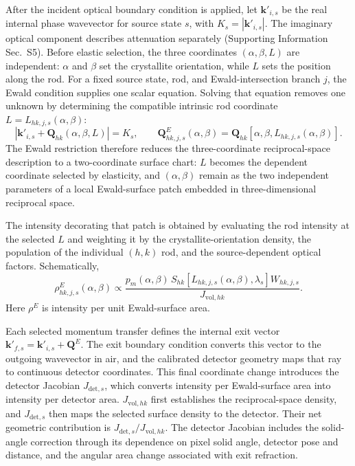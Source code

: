 After the incident optical boundary condition is applied, let $\mathbf k'_{i,s}$ be the real internal phase wavevector for source state $s$, with $K_s=|\mathbf k'_{i,s}|$. The imaginary optical component describes attenuation separately (Supporting Information Sec.~S5). Before elastic selection, the three coordinates $(\alpha,\beta,L)$ are independent: $\alpha$ and $\beta$ set the crystallite orientation, while $L$ sets the position along the rod. For a fixed source state, rod, and Ewald-intersection branch $j$, the Ewald condition supplies one scalar equation. Solving that equation removes one unknown by determining the compatible intrinsic rod coordinate $L=L_{hk,j,s}(\alpha,\beta)$:
\begin{equation}
  \left|\mathbf k'_{i,s}+\mathbf Q_{hk}(\alpha,\beta,L)\right|=K_s,
  \qquad
  \mathbf Q^{E}_{hk,j,s}(\alpha,\beta)
  =\mathbf Q_{hk}\!\left[\alpha,\beta,L_{hk,j,s}(\alpha,\beta)\right].
  \label{eq:ewald_surface_parameterization_main}
\end{equation}
The Ewald restriction therefore reduces the three-coordinate reciprocal-space description to a two-coordinate surface chart: $L$ becomes the dependent coordinate selected by elasticity, and $(\alpha,\beta)$ remain as the two independent parameters of a local Ewald-surface patch embedded in three-dimensional reciprocal space.

The intensity decorating that patch is obtained by evaluating the rod intensity at the selected $L$ and weighting it by the crystallite-orientation density, the population of the individual $(h,k)$ rod, and the source-dependent optical factors. Schematically,
\begin{equation}
  \rho^{E}_{hk,j,s}(\alpha,\beta)
  \propto
  \frac{p_m(\alpha,\beta)\,
  S_{hk}\!\left[L_{hk,j,s}(\alpha,\beta),\lambda_s\right]W_{hk,j,s}}
  {J_{\mathrm{vol},hk}}.
  \label{eq:ewald_surface_density_main}
\end{equation}
Here $\rho^{E}$ is intensity per unit Ewald-surface area.

Each selected momentum transfer defines the internal exit vector $\mathbf k'_{f,s}=\mathbf k'_{i,s}+\mathbf Q^{E}$. The exit boundary condition converts this vector to the outgoing wavevector in air, and the calibrated detector geometry maps that ray to continuous detector coordinates. This final coordinate change introduces the detector Jacobian $J_{\mathrm{det},s}$, which converts intensity per Ewald-surface area into intensity per detector area. $J_{\mathrm{vol},hk}$ first establishes the reciprocal-space density, and $J_{\mathrm{det},s}$ then maps the selected surface density to the detector. Their net geometric contribution is $J_{\mathrm{det},s}/J_{\mathrm{vol},hk}$. The detector Jacobian includes the solid-angle correction through its dependence on pixel solid angle, detector pose and distance, and the angular area change associated with exit refraction.

